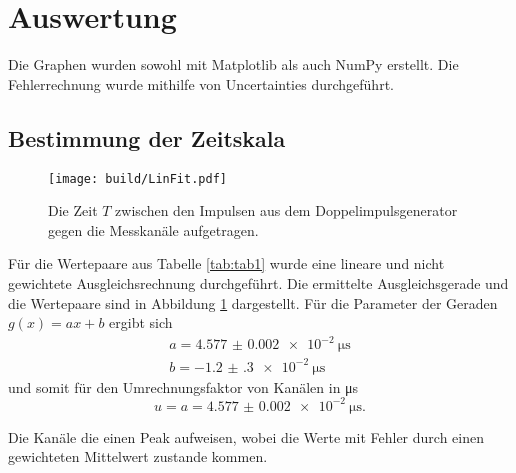 \section{Auswertung}
\label{sec:Auswertung}


Die Graphen wurden sowohl mit Matplotlib \cite{matplotlib} als auch NumPy \cite{numpy} erstellt. Die
Fehlerrechnung wurde mithilfe von Uncertainties \cite{uncertainties} durchgeführt.


\subsection{Bestimmung der Zeitskala}
\begin{figure}
	\centering
	\texttt{[image: build/LinFit.pdf]}
	\caption{Die Zeit $T$ zwischen den Impulsen aus dem Doppelimpulsgenerator gegen die Messkanäle aufgetragen.}
	\label{fig:erste}
\end{figure}

Für die Wertepaare aus Tabelle \ref{tab:tab1}  wurde eine lineare und nicht gewichtete Ausgleichsrechnung durchgeführt. Die ermittelte Ausgleichsgerade und die Wertepaare sind in Abbildung \ref{fig:erste} dargestellt. Für die Parameter der Geraden $g(x)=a x + b$ ergibt sich
\begin{gather*}
a=\SI{4.577(2)e-2}{\micro\second}\\
b=\SI{-1.2(3)e-2}{\micro\second}
\end{gather*}
und somit für den Umrechnungsfaktor von Kanälen in \si{\micro\second}
\begin{displaymath}
u=a=\SI{4.577(2)e-2}{\micro\second}.
\end{displaymath}
\begin{table}
	\centering
	\caption{Die Kanäle die einen Peak aufweisen, wobei die Werte mit Fehler durch einen gewichteten Mittelwert zustande kommen.}
	
\end{table}
